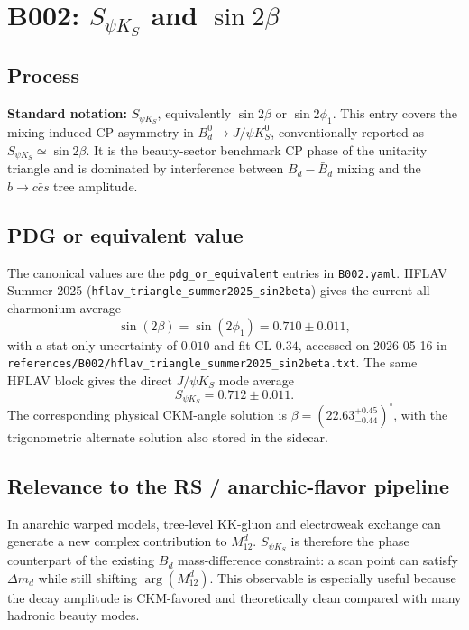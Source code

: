 
\section{B002: \(S_{\psi K_S}\) and \(\sin 2\beta\)}

\subsection*{Process}
\textbf{Standard notation:} \(S_{\psi K_S}\), equivalently
\(\sin 2\beta\) or \(\sin 2\phi_1\).
This entry covers the mixing-induced CP asymmetry in
\(B_d^0\to J/\psi K_S^0\), conventionally reported as
\(S_{\psi K_S}\simeq \sin 2\beta\).  It is the beauty-sector benchmark CP
phase of the unitarity triangle and is dominated by interference between
\(B_d-\bar B_d\) mixing and the \(b\to c\bar c s\) tree amplitude.

\subsection*{PDG or equivalent value}
The canonical values are the \texttt{pdg\_or\_equivalent} entries in
\texttt{B002.yaml}.  HFLAV Summer 2025
(\texttt{hflav\_triangle\_summer2025\_sin2beta}) gives
the current all-charmonium average
\[
  \sin(2\beta)=\sin(2\phi_1)=0.710\pm0.011,
\]
with a stat-only uncertainty of \(0.010\) and fit CL \(0.34\), accessed on
2026-05-16 in
\texttt{references/B002/hflav\_triangle\_summer2025\_sin2beta.txt}.  The
same HFLAV block gives the direct \(J/\psi K_S\) mode average
\[
  S_{\psi K_S}=0.712\pm0.011.
\]
The corresponding physical CKM-angle solution is
\(\beta=(22.63^{+0.45}_{-0.44})^\circ\), with the trigonometric alternate
solution also stored in the sidecar.

\subsection*{Relevance to the RS / anarchic-flavor pipeline}
In anarchic warped models, tree-level KK-gluon and electroweak exchange can
generate a new complex contribution to \(M_{12}^d\).  \(S_{\psi K_S}\) is
therefore the phase counterpart of the existing \(B_d\) mass-difference
constraint: a scan point can satisfy \(\Delta m_d\) while still shifting
\(\arg(M_{12}^d)\).  This observable is especially useful because the decay
amplitude is CKM-favored and theoretically clean compared with many hadronic
beauty modes.

